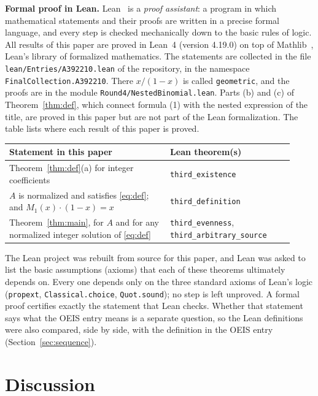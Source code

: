 \documentclass[11pt,a4paper]{article}
\theoremstyle{definition}
\theoremstyle{remark}
\newcommand{\para}[1]{\par\medskip\noindent\textbf{#1}\enspace}
\begin{document}
\para{Formal proof in Lean.}
Lean~\cite{lean} is a \emph{proof assistant}: a program in which mathematical statements and their proofs are written
in a precise formal language, and every step is checked mechanically down to the basic rules of logic. All results of
this paper are proved in Lean~4 (version 4.19.0) on top of Mathlib~\cite{mathlib}, Lean's library of formalized
mathematics. The statements are collected in the file \texttt{lean/Entries/A392210.lean} of the repository,
in the namespace \texttt{FinalCollection.A392210}. There $x/(1-x)$ is called \texttt{geometric}, and the proofs are in the module \texttt{Round4/NestedBinomial.lean}. Parts (b) and (c) of Theorem~\ref{thm:def}, which connect formula (1) with the nested expression of the title, are proved in this paper but are not part of the Lean formalization.
The table lists where each result of this paper is proved.
\begin{center}\small\renewcommand{\arraystretch}{1.25}
\begin{tabular}{>{\raggedright\arraybackslash}p{0.52\linewidth}>{\raggedright\arraybackslash}p{0.4\linewidth}}
\toprule
Statement in this paper & Lean theorem(s)\\
\midrule
Theorem~\ref{thm:def}(a) for integer coefficients & \texttt{third\_\allowbreak{}existence} \\
$A$ is normalized and satisfies \eqref{eq:def}; and $M_1(x)\cdot(1-x)=x$ & \texttt{third\_\allowbreak{}definition} \\
Theorem~\ref{thm:main}, for $A$ and for any normalized integer solution of \eqref{eq:def} & \texttt{third\_\allowbreak{}evenness}, \texttt{third\_\allowbreak{}arbitrary\_\allowbreak{}source} \\
\bottomrule
\end{tabular}
\end{center}
The Lean project was rebuilt from source for this paper, and Lean was asked to list the basic assumptions (axioms)
that each of these theorems ultimately depends on. Every one depends only on the three standard axioms of Lean's logic
(\texttt{propext}, \texttt{Classical.choice}, \texttt{Quot.sound}); no step is left unproved. A formal proof certifies
exactly the statement that Lean checks. Whether that statement says what the OEIS entry means is a separate question,
so the Lean definitions were also compared, side by side, with the definition in the OEIS entry
(Section~\ref{sec:sequence}).

\section{Discussion}\label{sec:discussion}
\end{document}
